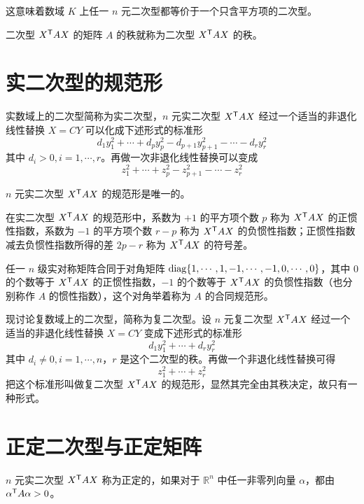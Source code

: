 这意味着数域 $K$ 上任一 $n$ 元二次型都等价于一个只含平方项的二次型。

二次型 ${X}^\mathsf{T}AX$ 的矩阵 $A$ 的秩就称为二次型 ${X}^\mathsf{T}AX$ 的秩。

\section{实二次型的规范形}

实数域上的二次型简称为实二次型，$n$ 元实二次型 ${X}^\mathsf{T}AX$ 经过一个适当的非退化线性替换 $X = CY$ 可以化成下述形式的标准形
\[d_1y_1^2+\cdots+d_py_p^2-d_{p+1}y_{p+1}^2-\cdots-d_ry_r^2\]
其中 $d_i>0,i=1,\cdots,r$。再做一次非退化线性替换可以变成
\[z_1^2+\cdots+z_p^2-z_{p+1}^2-\cdots-z_r^2\]

\begin{theorem}
	$n$ 元实二次型 ${X}^\mathsf{T}AX$ 的规范形是唯一的。
\end{theorem}

\begin{definition}
	在实二次型 ${X}^\mathsf{T}AX$ 的规范形中，系数为 $+1$ 的平方项个数 $p$ 称为 ${X}^\mathsf{T}AX$ 的正惯性指数，系数为 $-1$ 的平方项个数 $r-p$ 称为 ${X}^\mathsf{T}AX$ 的负惯性指数；正惯性指数减去负惯性指数所得的差 $2p-r$ 称为 ${X}^\mathsf{T}AX$ 的符号差。
\end{definition}

任一 $n$ 级实对称矩阵合同于对角矩阵 $\operatorname{diag}\{1,\cdots,1,-1,\cdots,-1,0,\cdots,0\}$，其中 $0$ 的个数等于 ${X}^\mathsf{T}AX$ 的正惯性指数，$-1$ 的个数等于 ${X}^\mathsf{T}AX$ 的负惯性指数（也分别称作 $A$ 的惯性指数），这个对角举着称为 $A$ 的合同规范形。

现讨论复数域上的二次型，简称为复二次型。设 $n$ 元复二次型 ${X}^\mathsf{T}AX$ 经过一个适当的非退化线性替换 $X = CY$ 变成下述形式的标准形
\[d_1y_1^2+\cdots+d_ry_r^2\]
其中 $d_i\ne 0,i=1,\cdots,n$，$r$ 是这个二次型的秩。再做一个非退化线性替换可得
\[z_1^2+\cdots+z_r^2\]
把这个标准形叫做复二次型 ${X}^\mathsf{T}AX$ 的规范形，显然其完全由其秩决定，故只有一种形式。

\section{正定二次型与正定矩阵}

\begin{definition}
	$n$ 元实二次型 ${X}^\mathsf{T}AX$ 称为正定的，如果对于 $\mathbb{R}^n$ 中任一非零列向量 $\alpha$，都由 ${\alpha}^\mathsf{T}A\alpha>0$。
\end{definition}

